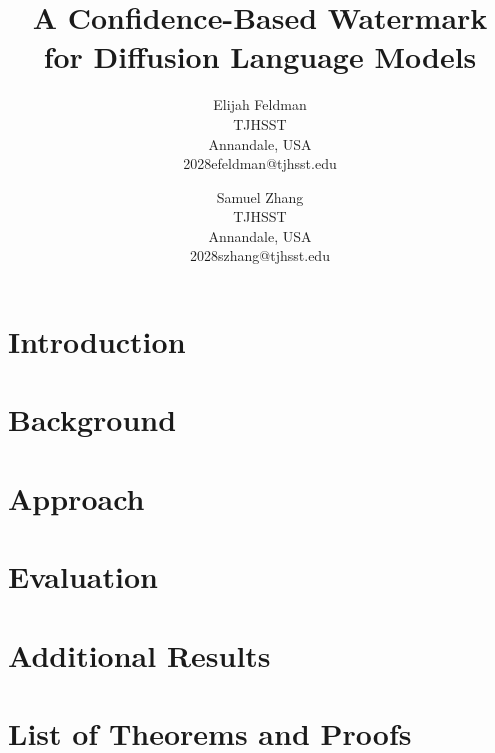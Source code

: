 \documentclass{article}
\title{A Confidence-Based Watermark for Diffusion Language Models}
\author{
Elijah Feldman \\
TJHSST \\
Annandale, USA \\
2028efeldman@tjhsst.edu
\and
Samuel Zhang \\
TJHSST \\
Annandale, USA \\
2028szhang@tjhsst.edu
}
\date{}
\begin{document}
\maketitle
\pagestyle{empty}
\nocite{*}

\begin{abstract}

\end{abstract}

\section{Introduction}

\section{Background}

\section{Approach}

\section{Evaluation}


\clearpage




\section*{Additional Results}

\section*{List of Theorems and Proofs}

\end{document}
